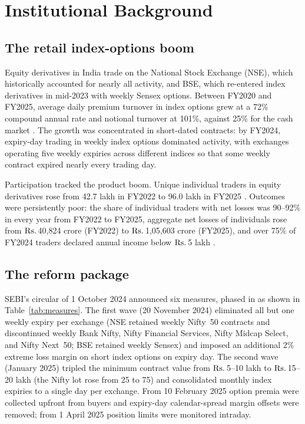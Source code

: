 \documentclass[12pt]{article}
\newcommand{\rupee}{\text{Rs.}\,}
\begin{document}
\section{Institutional Background}\label{sec:background}

\subsection{The retail index-options boom}

Equity derivatives in India trade on the National Stock Exchange (NSE), which
historically accounted for nearly all activity, and BSE, which re-entered
index derivatives in mid-2023 with weekly Sensex options. Between FY2020 and
FY2025, average daily premium turnover in index options grew at a 72\%
compound annual rate and notional turnover at 101\%, against 25\% for the
cash market \citep{sebi2025comparative}. The growth was concentrated in
short-dated contracts: by FY2024, expiry-day trading in weekly index options
dominated activity, with exchanges operating five weekly expiries across
different indices so that some weekly contract expired nearly every trading
day.

Participation tracked the product boom. Unique individual traders in equity
derivatives rose from 42.7 lakh in FY2022 to 96.0 lakh in FY2025
\citep{sebi2025comparative}. Outcomes were persistently poor: the share of
individual traders with net losses was 90--92\% in every year from FY2022 to
FY2025, aggregate net losses of individuals rose from
\(\text{\rupee}\)40,824 crore (FY2022) to \(\text{\rupee}\)1,05,603 crore
(FY2025), and over 75\% of FY2024 traders declared annual income below
\(\text{\rupee}\)5 lakh \citep{sebi2024study,sebi2025comparative}.

\subsection{The reform package}

SEBI's circular of 1 October 2024 announced six measures, phased in as shown
in Table~\ref{tab:measures}. The first wave (20 November 2024) eliminated
all but one weekly expiry per exchange (NSE retained weekly Nifty~50
contracts and discontinued weekly Bank Nifty, Nifty Financial Services,
Nifty Midcap Select, and Nifty Next~50; BSE retained weekly Sensex) and
imposed an additional 2\% extreme loss margin on short index options on
expiry day. The second wave (January 2025) tripled the minimum contract
value from \(\text{\rupee}\)5--10 lakh to \(\text{\rupee}\)15--20 lakh
(the Nifty lot rose from 25 to 75) and consolidated monthly index expiries
to a single day per exchange. From 10 February 2025 option premia were
collected upfront from buyers and expiry-day calendar-spread margin offsets
were removed; from 1 April 2025 position limits were monitored intraday.
\end{document}
